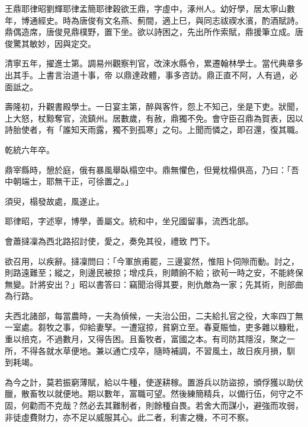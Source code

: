 
\begin{pinyinscope}

 王鼎耶律昭劉輝耶律孟簡耶律穀欲王鼎，字虛中，涿州人。幼好學，居太寧山數年，博通經史。時為唐俊有文名燕、薊間，適上巳，與同志祓禊水濱，酌酒賦詩。鼎偶造席，唐俊見鼎樸野，置下坐。欲以詩困之，先出所作索賦，鼎援筆立成。唐俊驚其敏妙，因與定交。



 清寧五年，擢進士第。調易州觀察判官，改淶水縣令，累遷翰林學士。當代典章多出其手。上書言治道十事，帝
 以鼎達政體，事多咨訪。鼎正直不阿，人有過，必面詆之。



 壽隆初，升觀書殿學士。一日宴主第，醉與客忤，怨上不知己，坐是下吏。狀聞，上大怒，杖黥奪官，流鎮州。居數歲，有赦，鼎獨不免。會守臣召鼎為賀表，因以詩胎使者，有「誰知天雨露，獨不到孤寒」之句。上聞而憐之，即召還，復其職。



 乾統六年卒。



 鼎宰縣時，憩於庭，俄有暴風舉臥榻空中。鼎無懼色，但覺枕榻俱高，乃曰：「吾中朝端士，耶無干正，可徐置之。」



 須臾，榻發故處，風遂止。



 耶律昭，字述寧，博學，善屬文。統和中，坐兄國留事，流西北部。



 會蕭撻凜為西北路招討使，愛之，奏免其役，禮致
 門下。



 欲召用，以疾辭。撻凜問曰：「今軍旅甫罷，三邊宴然，惟阻卜伺隙而動。討之，則路遠難至；縱之，則邊民被掠；增戍兵，則饋餉不給；欲茍一時之安，不能終保無變。計將安出？」昭以書答曰：竊聞治得其要，則仇敵為一家；先其術，則部曲為行路。



 夫西北諸部，每當農時，一夫為偵候，一夫治公田，二夫給扎官之役，大率四丁無一室處。芻牧之事，仰給妻孥。一遭寇掠，貧窮立至。春夏賑恤，吏多雜以糠粃，重以掊克，不過數月，又得告困。且畜牧者，富國之本。有司防其隱沒，聚之一所，不得各就水草便地。兼以通亡戍卒，隨時補調，不習風土，故日疾月損，馴
 到耗竭。



 為今之計，莫若振窮薄賦，給以牛種，使遂耕稼。置游兵以防盜掠，頒俘獲以助伏臘，散畜牧以就便地。期以數年，富職可望。然後練簡精兵，以備行伍，何守之不固，何勸而不克哉？然必去其難制者，則餘種自畏。若舍大而謀小，避強而攻弱，非徒虛費財力，亦不足以威服其心。此二者，利害之機，不可不察。




\end{pinyinscope}
